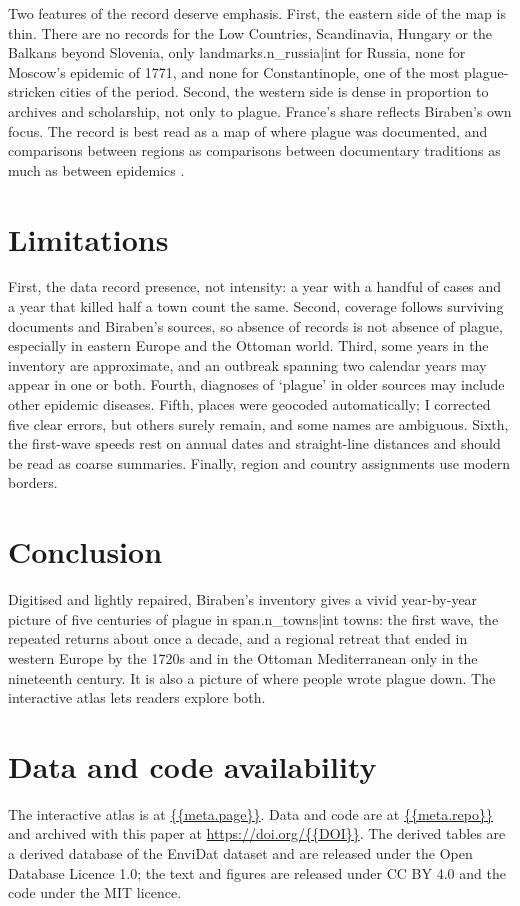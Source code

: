 \documentclass[11pt,a4paper]{article}
\begin{document}
Two features of the record deserve emphasis. First, the eastern side of the map is thin. There are no records for the Low Countries, Scandinavia, Hungary or the Balkans beyond Slovenia, only {{landmarks.n_russia|int}} for Russia, none for Moscow's epidemic of 1771, and none for Constantinople, one of the most plague-stricken cities of the period. Second, the western side is dense in proportion to archives and scholarship, not only to plague. France's share reflects Biraben's own focus. The record is best read as a map of where plague was documented, and comparisons between regions as comparisons between documentary traditions as much as between epidemics \citep{roosen2018}.

\section{Limitations}
First, the data record presence, not intensity: a year with a handful of cases and a year that killed half a town count the same. Second, coverage follows surviving documents and Biraben's sources, so absence of records is not absence of plague, especially in eastern Europe and the Ottoman world. Third, some years in the inventory are approximate, and an outbreak spanning two calendar years may appear in one or both. Fourth, diagnoses of `plague' in older sources may include other epidemic diseases. Fifth, places were geocoded automatically; I corrected five clear errors, but others surely remain, and some names are ambiguous. Sixth, the first-wave speeds rest on annual dates and straight-line distances and should be read as coarse summaries. Finally, region and country assignments use modern borders.

\section{Conclusion}
Digitised and lightly repaired, Biraben's inventory gives a vivid year-by-year picture of five centuries of plague in {{span.n_towns|int}} towns: the first wave, the repeated returns about once a decade, and a regional retreat that ended in western Europe by the 1720s and in the Ottoman Mediterranean only in the nineteenth century. It is also a picture of where people wrote plague down. The interactive atlas lets readers explore both.

\section*{Data and code availability}
The interactive atlas is at \url{{{meta.page}}}. Data and code are at \url{{{meta.repo}}} and archived with this paper at \url{https://doi.org/{{DOI}}}. The derived tables are a derived database of the EnviDat dataset and are released under the Open Database Licence 1.0; the text and figures are released under CC BY 4.0 and the code under the MIT licence.
\end{document}
